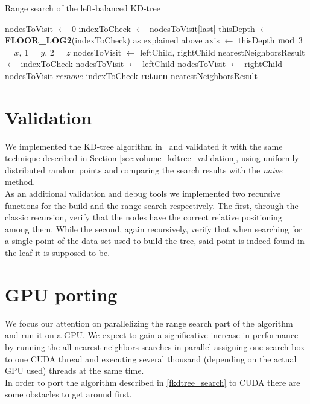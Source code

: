 \begin{algorithm}
\caption{Range search of the left-balanced KD-tree}
\label{fkdtree_search}
\begin{algorithmic}
  \State nodesToVisit $\gets$ 0
  	\State indexToCheck $\gets$ nodesToVisit[last]
  	\State thisDepth $\gets$ \textbf{FLOOR\_LOG2}(indexToCheck) \Comment as explained above
	\State axis $\gets$ thisDepth $\bmod$ 3  = $x$, 1 = $y$, 2 = $z$
		\State nodesToVisit $\gets$ leftChild, rightChild
		\State nearestNeighborsResult $\gets$ indexToCheck
		\State nodesToVisit $\gets$ leftChild
	\Else
		\State nodesToVisit $\gets$ rightChild
	\EndIf		
	\State nodesToVisit $\textit{remove}$ indexToCheck
  \EndWhile
  \State \textbf{return} nearestNeighborsResult
\EndProcedure
\end{algorithmic}
\end{algorithm}

\section{Validation}
We implemented the KD-tree algorithm in \CC\ and validated it with the same technique described in Section \ref{sec:volume_kdtree_validation}, using uniformly distributed random points and comparing the search results with the \textit{naive} method.\\
As an additional validation and debug tools we implemented two recursive functions for the build and the range search respectively.
The first, through the classic recursion, verify that the nodes have the correct relative positioning among them. While the second, again recursively, verify that when searching for a single point of the data set used to build the tree, said point is indeed found in the leaf it is supposed to be.\\

\section{GPU porting}
We focus our attention on parallelizing the range search part of the algorithm and run it on a GPU. We expect to gain a significative increase in performance by running the all nearest neighbors searches in parallel assigning one search box to one CUDA thread and executing several thousand (depending on the actual GPU used) threads at the same time.\\
In order to port the algorithm described in \ref{fkdtree_search} to CUDA there are some obstacles to get around first.\\

